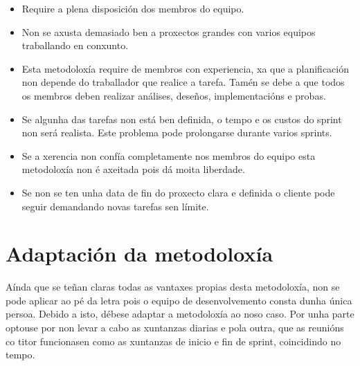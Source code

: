 \begin{itemize}
	\item Require a plena disposición dos membros do equipo.
	\item Non se axusta demasiado ben a proxectos grandes con varios equipos traballando en conxunto.
	\item Esta metodoloxía require de membros con experiencia, xa que a planificación non depende do traballador que realice a tarefa. Tamén se debe a que todos os membros deben realizar análises, deseños, implementacións e probas.
	\item Se algunha das tarefas non está ben definida, o tempo e os custos do sprint non será realista. Este problema pode prolongarse durante varios sprints.
	\item Se a xerencia non confía completamente nos membros do equipo esta metodoloxía non é axeitada pois dá moita liberdade.
	\item Se non se ten unha data de fin do proxecto clara e definida o cliente pode seguir demandando novas tarefas sen límite.
\end{itemize}


\section{Adaptación da metodoloxía}
Aínda que se teñan claras todas as vantaxes propias desta metodoloxía, non se pode aplicar ao pé da letra pois o equipo de desenvolvemento consta dunha única persoa. Debido a isto, débese adaptar a metodoloxía ao noso caso. Por unha parte optouse por non levar a cabo as xuntanzas diarias e pola outra, que as reunións co titor funcionasen como as xuntanzas de inicio e fin de sprint, coincidindo no tempo.

